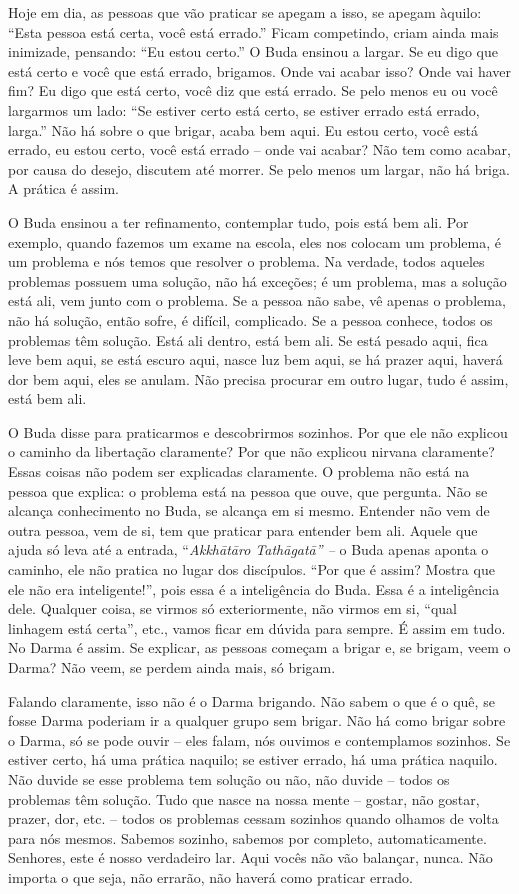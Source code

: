 Hoje em dia, as pessoas que vão praticar se apegam a isso, se apegam
àquilo: “Esta pessoa está certa, você está errado.” Ficam competindo,
criam ainda mais inimizade, pensando: “Eu estou certo.” O Buda ensinou
a largar. Se eu digo que está certo e você que está errado, brigamos.
Onde vai acabar isso? Onde vai haver fim? Eu digo que está certo, você
diz que está errado. Se pelo menos eu ou você largarmos um lado: “Se
estiver certo está certo, se estiver errado está errado, larga.” Não há
sobre o que brigar, acaba bem aqui. Eu estou certo, você está errado,
eu estou certo, você está errado – onde vai acabar? Não tem como
acabar, por causa do desejo, discutem até morrer. Se pelo menos um
largar, não há briga. A prática é assim. 

O Buda ensinou a ter refinamento, contemplar tudo, pois está bem
ali. Por exemplo, quando fazemos um exame na escola, eles nos colocam
um problema, é um problema e nós temos que resolver o problema. Na
verdade, todos aqueles problemas possuem uma solução, não há exceções;
é um problema, mas a solução está ali, vem junto com o problema. Se a
pessoa não sabe, vê apenas o problema, não há solução, então sofre, é
difícil, complicado. Se a pessoa conhece, todos os problemas têm
solução. Está ali dentro, está bem ali. Se está pesado aqui, fica leve
bem aqui, se está escuro aqui, nasce luz bem aqui, se há prazer aqui,
haverá dor bem aqui, eles se anulam. Não precisa procurar em outro
lugar, tudo é assim, está bem ali. 

O Buda disse para praticarmos e descobrirmos sozinhos. Por que ele
não explicou o caminho da libertação claramente? Por que não explicou
nirvana claramente? Essas coisas não podem ser explicadas claramente. O
problema não está na pessoa que explica: o problema está na pessoa que
ouve, que pergunta. Não se alcança conhecimento no Buda, se alcança em
si mesmo. Entender não vem de outra pessoa, vem de si, tem que praticar
para entender bem ali. Aquele que ajuda só leva até a entrada,
“\textit{Akkhātāro Tathāgatā” –} o Buda apenas aponta o
caminho, ele não pratica no lugar dos discípulos. “Por que é assim?
Mostra que ele não era inteligente!”, pois essa é a inteligência do
Buda. Essa é a inteligência dele. Qualquer coisa, se virmos só
exteriormente, não virmos em si, “qual linhagem está certa”, etc.,
vamos ficar em dúvida para sempre. É assim em tudo. No Darma é assim.
Se explicar, as pessoas começam a brigar e, se brigam, veem o Darma?
Não veem, se perdem ainda mais, só brigam. 

Falando claramente, isso não é o Darma brigando. Não sabem o que é o
quê, se fosse Darma poderiam ir a qualquer grupo sem brigar. Não há
como brigar sobre o Darma, só se pode ouvir – eles falam, nós ouvimos e
contemplamos sozinhos. Se estiver certo, há uma prática naquilo; se
estiver errado, há uma prática naquilo. Não duvide se esse problema tem
solução ou não, não duvide – todos os problemas têm solução. Tudo que
nasce na nossa mente – gostar, não gostar, prazer, dor, etc. – todos os
problemas cessam sozinhos quando olhamos de volta para nós mesmos.
Sabemos sozinho, sabemos por completo, automaticamente. Senhores, este
é nosso verdadeiro lar. Aqui vocês não vão balançar, nunca. Não importa
o que seja, não errarão, não haverá como praticar errado. 

